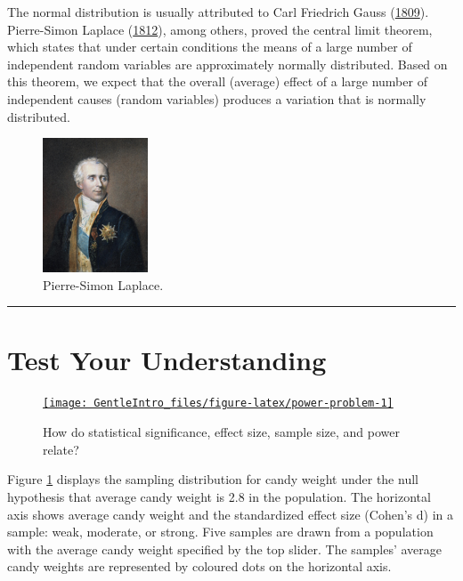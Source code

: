 \documentclass[a4paper]{book}
\theoremstyle{definition}
\theoremstyle{definition}
\theoremstyle{definition}
\theoremstyle{remark}
\begin{document}
The normal distribution is usually attributed to Carl Friedrich Gauss
(\protect\hyperlink{ref-RefWorks:3936}{1809}). Pierre-Simon Laplace
(\protect\hyperlink{ref-RefWorks:3937}{1812}), among others, proved the
central limit theorem, which states that under certain conditions the
means of a large number of independent random variables are
approximately normally distributed. Based on this theorem, we expect
that the overall (average) effect of a large number of independent
causes (random variables) produces a variation that is normally
distributed.

\begin{figure}[H]
\centering
\includegraphics{figures/pslaplace.png}
\caption{Pierre-Simon Laplace.}
\end{figure}

\begin{center}\rule{0.5\linewidth}{\linethickness}\end{center}

\section{Test Your Understanding}\label{test-your-understanding-5}

\begin{figure}[H]
\href{http://82.196.4.233:3838/apps/sig-effect-power/}{\texttt{[image: GentleIntro\_files/figure-latex/power-problem-1]} }\caption{How do statistical significance, effect size, sample size, and power relate?}\label{fig:power-problem}
\end{figure}

Figure \ref{fig:power-problem} displays the sampling distribution for
candy weight under the null hypothesis that average candy weight is 2.8
in the population. The horizontal axis shows average candy weight and
the standardized effect size (Cohen's d) in a sample: weak, moderate, or
strong. Five samples are drawn from a population with the average candy
weight specified by the top slider. The samples' average candy weights
are represented by coloured dots on the horizontal axis.
\end{document}
